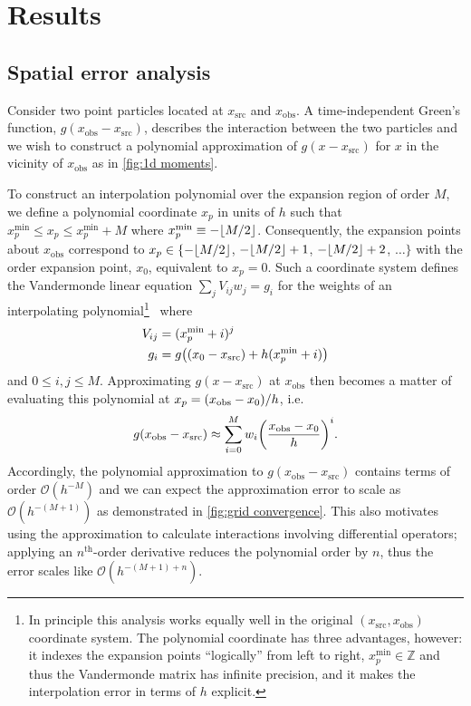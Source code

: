 \section{Results}

\subsection{Spatial error analysis}

Consider two point particles located at $x_\text{src}$ and $x_\text{obs}$.
A time-independent Green's function, $g(x_\text{obs} - x_\text{src})$, describes the interaction between the two particles and we wish to construct a polynomial approximation of $g(x - x_\text{src})$ for $x$ in the vicinity of $x_\text{obs}$ as in \cref{fig:1d moments}.

To construct an interpolation polynomial over the expansion region of order $M$, we define a polynomial coordinate $x_p$ in units of $h$ such that $x_p^\text{min} \leqslant x_p \leqslant x_p^\text{min} + M$ where $x_p^\text{min} \equiv -\floor*{M/2}$.
Consequently, the expansion points about $x_\text{obs}$ correspond to $x_p \in \{-\floor*{M/2}$, $-\floor*{M/2} + 1$, $-\floor*{M/2} + 2$, $\ldots\}$ with the  order expansion point, $x_0$, equivalent to $x_p = 0$.
Such a coordinate system defines the Vandermonde linear equation $\sum_{j}V_{ij} w_j = g_i$ for the weights of an interpolating polynomial\footnote{In principle this analysis works equally well in the original $(x_\text{src}, x_\text{obs})$ coordinate system. The polynomial coordinate has three advantages, however: it indexes the expansion points ``logically'' from left to right, $x_p^\text{min} \in \mathbb{Z}$ and thus the Vandermonde matrix has infinite precision, and it makes the interpolation error in terms of $h$ explicit.}~\cite{NumericalRecipes} where
\begin{subequations}
  \begin{align}
    V_{ij} &= (x_p^\text{min} + i)^j \\
    g_i &= g\qty((x_0 - x_\text{src}) + h(x_p^\text{min} + i))
  \end{align}
\end{subequations}
and $0 \leqslant i, j \leqslant M$.
Approximating $g(x - x_\text{src})$ at $x_\text{obs}$ then becomes a matter of evaluating this polynomial at $x_p = \qty(x_\text{obs} - x_0)/h$, i.e.
\begin{equation}
  g(x_\text{obs} - x_\text{src}) \approx \sum_{i = 0}^{M} w_i \qty(\frac{x_\text{obs} - x_0}{h})^i.
\end{equation}
Accordingly, the polynomial approximation to $g(x_\text{obs} - x_\text{src})$ contains terms of order $\mathcal{O}(h^{-M})$ and we can expect the approximation error to scale as $\mathcal{O}(h^{-(M + 1)})$ as demonstrated in \cref{fig:grid convergence}.
This also motivates using the approximation to calculate interactions involving differential operators; applying an $n^\text{th}$-order derivative reduces the polynomial order by $n$, thus the error scales like $\mathcal{O}(h^{-(M + 1) + n})$.

